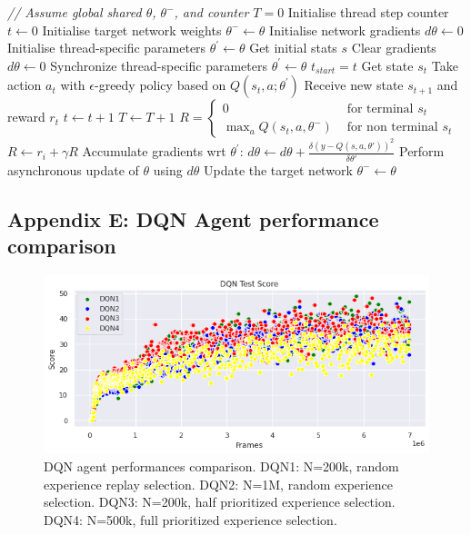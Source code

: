 \documentclass{article}
\begin{document}
\begin{algorithmic}[1]
\State \textit{// Assume global shared  $\theta$, $\theta^{-}$, and counter $T = 0$}
\State Initialise thread step counter $t \gets 0$
\State Initialise target network weights $\theta^{-} \gets \theta$
\State Initialise network gradients $d\theta \gets 0$
\State Initialise thread-specific parameters $\theta^\prime \gets \theta$
\State Get initial stats $s$
    \State Clear gradients $d\theta \gets 0$
    \State Synchronize thread-specific parameters $\theta^\prime \gets \theta$
    \State $t_{start} = t$
    \State Get state $s_t$
        \State Take action $a_t$ with $\epsilon$-greedy policy based on $Q\left(s_t,a;\theta^\prime\right)$
        \State Receive new state $s_{t+1}$ and reward $r_t$
        \State $t \gets t + 1$
        \State $T \gets T + 1$
    \EndWhile
    \State $R= \begin{cases}0 & \text { for terminal } s_t \\ \max _{a} Q\left(s_t, a, \theta^{-}\right) & \text { for non terminal } s_t\end{cases}$
        \State $R \gets r_i + \gamma R$
        \State Accumulate gradients wrt $\theta^\prime$: $d\theta \gets d\theta + \frac{\delta\left( y-Q\left(s, a, \theta\prime\right)\right)^{2}}{\delta\theta\prime}$
    \EndFor
    \State Perform asynchronous update of $\theta$ using $d\theta$
        \State Update the target network $\theta^{-} \gets \theta$
    \EndIf
\EndWhile

\end{algorithmic}


\subsection*{Appendix E: DQN Agent performance comparison}
\label{DQN_Agents_comp}
\begin{figure}[H]
\centering
\includegraphics[scale=0.65]{DQNAgentComparison.PNG}
\caption{DQN agent performances comparison. DQN1: N=200k, random experience replay selection. DQN2: N=1M, random experience selection. DQN3: N=200k, half prioritized experience  selection. DQN4: N=500k, full prioritized experience selection.}
\label{fig:DQNAgentComparison}
\end{figure}
\end{document}
